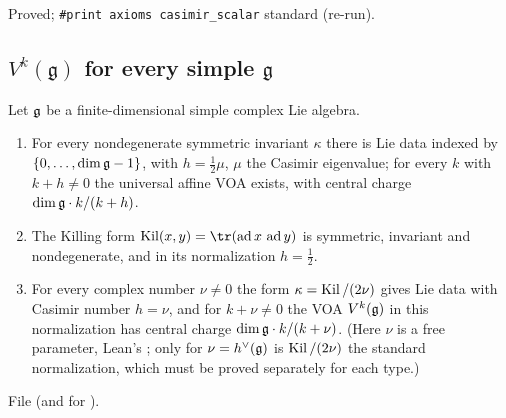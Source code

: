 \begin{status}
Proved; \texttt{\#print axioms casimir\_scalar} standard (re-run).
\end{status}

\subsection{\texorpdfstring{$V^k(\mathfrak g)$}{V\^{}k(g)} for every simple \texorpdfstring{$\mathfrak g$}{g}}

\begin{theorem}\label{l23:thm:simpleaffine}
Let $\mathfrak g$ be a finite-dimensional simple complex Lie algebra.
\begin{enumerate}
\item For every nondegenerate symmetric invariant $\kappa$ there is Lie data indexed by $\{0,\dots,\dim\mathfrak g-1\}$, with
  $h=\frac12\mu$, $\mu$ the Casimir eigenvalue; for every $k$ with $k+h\ne0$ the universal affine VOA exists, with central
  charge $\dim\mathfrak g\cdot k/(k+h)$.
\item The Killing form $\lxxiiiKil(x,y)=\tr(\lxxiiiad x\,\lxxiiiad y)$ is symmetric, invariant and nondegenerate, and in its
  normalization $h=\tfrac12$.
\item For every complex number $\nu\neq0$ the form $\kappa=\operatorname{Kil}/(2\nu)$ gives Lie data with Casimir number $h=\nu$, and for
  $k+\nu\neq0$ the VOA $V^k(\mathfrak g)$ in this normalization has central charge $\dim\mathfrak g\cdot k/(k+\nu)$. (Here $\nu$ is a free
  parameter, Lean's ; only for $\nu=h^\vee(\mathfrak g)$ is $\operatorname{Kil}/(2\nu)$ the standard normalization, which must be proved
  separately for each type.)
\end{enumerate}
\end{theorem}
\noindent File  (and
 for ).
